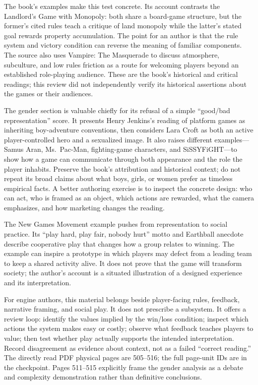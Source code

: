 The book's examples make this test concrete. Its account contrasts the Landlord's Game with Monopoly: both share a board-game structure, but the former's cited rules teach a critique of land monopoly while the latter's stated goal rewards property accumulation. The point for an author is that the rule system and victory condition can reverse the meaning of familiar components. The source also uses Vampire: The Masquerade to discuss atmosphere, subculture, and low rules friction as a route for welcoming players beyond an established role-playing audience. These are the book's historical and critical readings; this review did not independently verify its historical assertions about the games or their audiences.

The gender section is valuable chiefly for its refusal of a simple ``good/bad representation'' score. It presents Henry Jenkins's reading of platform games as inheriting boy-adventure conventions, then considers Lara Croft as both an active player-controlled hero and a sexualized image. It also raises different examples---Samus Aran, Ms.~Pac-Man, fighting-game characters, and SiSSYFiGHT---to show how a game can communicate through both appearance and the role the player inhabits. Preserve the book's attribution and historical context; do not repeat its broad claims about what boys, girls, or women prefer as timeless empirical facts. A better authoring exercise is to inspect the concrete design: who can act, who is framed as an object, which actions are rewarded, what the camera emphasizes, and how marketing changes the reading.

The New Games Movement example pushes from representation to social practice. Its ``play hard, play fair, nobody hurt'' motto and Earthball anecdote describe cooperative play that changes how a group relates to winning. The example can inspire a prototype in which players may defect from a leading team to keep a shared activity alive. It does not prove that the game will transform society; the author's account is a situated illustration of a designed experience and its interpretation.

For engine authors, this material belongs beside player-facing rules, feedback, narrative framing, and social play. It does not prescribe a subsystem. It offers a review loop: identify the values implied by the win/loss condition; inspect which actions the system makes easy or costly; observe what feedback teaches players to value; then test whether play actually supports the intended interpretation. Record disagreement as evidence about context, not as a failed ``correct reading.'' The directly read PDF physical pages are 505--516; the full page-unit IDs are in the checkpoint. Pages 511--515 explicitly frame the gender analysis as a debate and complexity demonstration rather than definitive conclusions.

